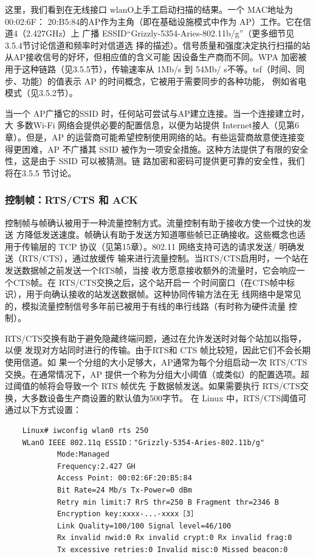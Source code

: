 这里，我们看到在无线接口 wlanO上手工启动扫描的结果。一个 MAC地址为 00:02:6F：
20:B5:84的AP作为主角（即在基础设施模式中作为 AP）工作。它在信道4（2.427GHz）上
广播 ESSID“Grizzly-5354-Aries-802.11b/g”（更多细节见3.5.4节讨论信道和频率时对信道选
择的描述）。信号质量和强度决定执行扫描的站从AP接收信号的好坏，但相应值的含义可能
因设备生产商而不同。WPA 加密被用于这种链路（见3.5.5节），传输速率从 1Mb/s 到 54Mb/
s不等。tsf（时间、同步、功能）的值表示 AP 的时间概念，它被用于需要同步的各种功能，
例如省电模式（见3.5.2节）。

当一个 AP广播它的SSID 时，任何站可尝试与AP建立连接。当一个连接建立时，大
多数Wi-Fi 网络会提供必要的配置信息，以便为站提供 Internet接人（见第6章）。但是，AP
的运营商可能希望控制使用网络的站。有些运营商故意使连接变得更困难，AP 不广播其
SSID 被作为一项安全措施。这种方法提供了有限的安全性，这是由于 SSID 可以被猜测。链
路加密和密码可提供更可靠的安全性，我们将在3.5.5 节讨论。

\subsubsection{控制帧：RTS/CTS 和 ACK}

控制帧与帧确认被用于一种流量控制方式。流量控制有助于接收方使一个过快的发送
方降低发送速度。帧确认有助于发送方知道哪些帧已正确接收。这些概念也适用于传输层的
TCP 协议（见第15章）。802.11 网络支持可选的请求发送/ 明确发送（RTS/CTS），通过放缓传
输来进行流量控制。当RTS/CTS启用时，一个站在发送数据帧之前发送一个RTS帧，当接
收方愿意接收额外的流量时，它会响应一个CTS帧。在 RTS/CTS交换之后，这个站开启一
个时间窗口（在CTS帧中标识），用于向确认接收的站发送数据帧。这种协同传输方法在无
线网络中是常见的，模拟流量控制信号多年前已被用于有线的串行线路（有时称为硬件流量
控制）。

RTS/CTS交换有助于避免隐藏终端问题，通过在允许发送时对每个站加以指导，以便
发现对方站同时进行的传输。由于RTS和 CTS 帧比较短，因此它们不会长期使用信道。如
果一个分组的大小足够大，AP通常为每个分组启动一次 RTS/CTS交换。在通常情况下，AP
提供一个称为分组大小阈值（或类似）的配置选项。超过阈值的帧将会导致一个 RTS 帧优先
于数据帧发送。如果需要执行 RTS/CTS交换，大多数设备生产商设置的默认值为500字节。
在 Linux 中，RTS/CTS阈值可通过以下方式设置：
\begin{verbatim}
    Linux# iwconfig wlan0 rts 250
    WLanO IEEE 802.11q ESSID："Grizzly-5354-Aries-802.11b/g"
            Mode:Managed
            Frequency:2.427 GH
            Access Point: 00:02:6F:20:B5:84
            Bit Rate=24 Mb/s Tx-Power=0 dBm
            Retry min limit:7 RrS thr=250 B Fragment thr=2346 B
            Encryption key:xxxx-...-xxxx［3］
            Link Quality=100/100 Signal level=46/100
            Rx invalid nwid:0 Rx invalid crypt:0 Rx invalid frag:0
            Tx excessive retries:0 Invalid misc:0 Missed beacon:0
\end{verbatim}

